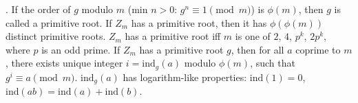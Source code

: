 .  If the order of $g$ modulo $m$ (min $n>0$:
$g^n \equiv 1 \pmod{m}$) is $\phi(m)$, then $g$ is called a primitive root.
If $Z_m$ has a primitive root, then it has $\phi(\phi(m))$ distinct primitive
roots. $Z_m$ has a primitive root iff $m$ is one of $2$, $4$,
$p^k$, $2p^k$, where $p$ is an odd prime.
If $Z_m$ has a primitive root $g$, then for all $a$ coprime to $m$,
there exists unique integer $i=\text{ind}_g(a)$ modulo $\phi(m)$,
such that $g^i \equiv a \pmod{m}$.
$\text{ind}_g(a)$ has logarithm-like properties:
$\text{ind}(1) = 0$, $\text{ind}(ab) = \text{ind}(a) + \text{ind}(b)$.

